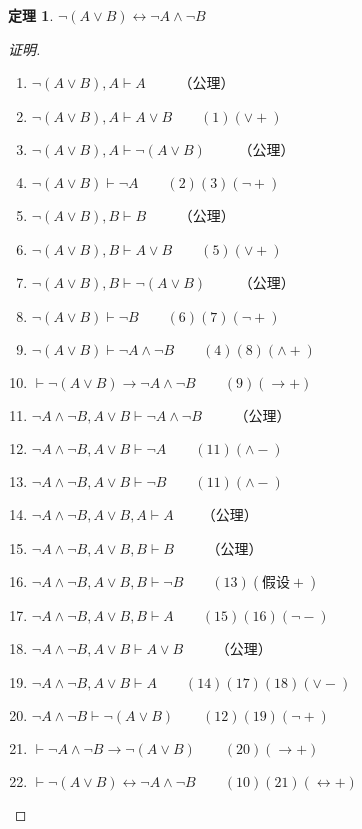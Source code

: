 \documentclass{article}
\newtheorem{Thm}{定理}
\begin{document}
\begin{CJK*}{UTF8}{gbsn}
  \begin{Thm}$\lnot (A\lor B)\leftrightarrow \lnot A \land \lnot B$\end{Thm}
  \begin{proof}[证明]$\quad$
    \begin{enumerate}
      \item $ \lnot (A\lor B), A\vdash A\qquad$ （公理） 
      \item $ \lnot (A\lor B), A\vdash A\lor B\qquad(1)(\lor +)$
      \item $ \lnot (A\lor B), A\vdash \lnot (A\lor B)\qquad$ （公理）
      \item $ \lnot (A\lor B) \vdash \lnot A\qquad(2)(3)(\lnot +)$
      \item $ \lnot (A\lor B), B\vdash B\qquad$ （公理） 
      \item $ \lnot (A\lor B), B\vdash A\lor B\qquad(5)(\lor +)$
      \item $ \lnot (A\lor B), B\vdash \lnot (A\lor B)\qquad$ （公理）
      \item $ \lnot (A\lor B) \vdash \lnot B\qquad(6)(7)(\lnot +)$
      \item $ \lnot (A\lor B)\vdash \lnot A \land \lnot B\qquad (4)(8)(\land +)$
      \item $ \vdash \lnot (A\lor B)\to \lnot A \land \lnot B\qquad (9)(\to +)$
      \item $ \lnot A\land \lnot B, A\lor B\vdash \lnot A \land \lnot B\qquad$ （公理） 
      \item $ \lnot A\land \lnot B, A\lor B\vdash \lnot A \qquad(11)(\land -)$
      \item $ \lnot A\land \lnot B, A\lor B\vdash \lnot B \qquad(11)(\land -)$
      \item $ \lnot A\land \lnot B, A\lor B, A\vdash A\qquad$（公理）
      \item $ \lnot A\land \lnot B, A\lor B, B\vdash B\qquad$ （公理）
      \item $ \lnot A\land \lnot B, A\lor B, B\vdash \lnot B\qquad(13)(\text{假设} +)$
      \item $ \lnot A\land \lnot B, A\lor B, B\vdash A\qquad(15)(16)(\lnot -)$
      \item $ \lnot A\land \lnot B, A\lor B\vdash A\lor B\qquad$ （公理）
      \item $ \lnot A\land \lnot B, A\lor B\vdash A\qquad(14)(17)(18)(\lor -)$
      \item $ \lnot A\land \lnot B\vdash \lnot(A\lor B)\qquad(12)(19)(\lnot +)\qquad$
      \item $ \vdash\lnot A\land \lnot B\to \lnot(A\lor B)\qquad(20)(\to +)$
      \item $ \vdash\lnot (A\lor B)\leftrightarrow \lnot A \land \lnot B\qquad(10)(21)(\leftrightarrow +)$
    \end{enumerate}
  \end{proof}


\end{CJK*}
\end{document}
